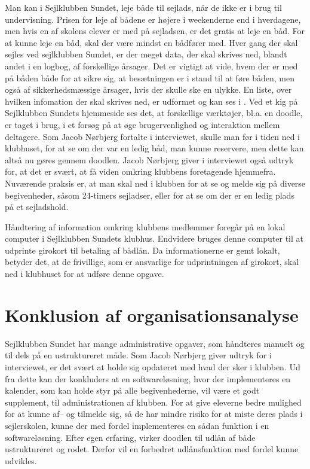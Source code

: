 Man kan i Sejlklubben Sundet, leje både til sejlads, når de ikke er i brug til undervisning. 
Prisen for leje af bådene er højere i weekenderne end i hverdagene, men hvis en af skolens elever er med på sejladsen, er det gratis at leje en båd. 
For at kunne leje en båd, skal der være mindst en bådfører med.
Hver gang der skal sejles ved sejlklubben Sundet, er der meget data, der skal skrives ned, blandt andet i en logbog, af forskellige årsager. 
Det er vigtigt at vide, hvem der er med på båden både for at sikre sig, at besætningen er i stand til at føre båden, men også af sikkerhedsmæssige årsager, hvis der skulle ske en ulykke. 
En liste, over hvilken infomation der skal skrives ned, er udformet og kan ses i . 
Ved et kig på Sejlklubben Sundets hjemmeside \citep{SundetUdlaan} ses det, at forskellige værktøjer, bl.a. en doodle, er taget i brug, i et forsøg på at øge brugervenlighed og interaktion mellem deltagere. 
Som Jacob Nørbjerg fortalte i interviewet, skulle man før i tiden ned i klubhuset, for at se om der var en ledig båd, man kunne reservere, men dette kan altså nu gøres gennem doodlen. 
Jacob Nørbjerg giver i interviewet også udtryk for, at det er svært, at få viden omkring klubbens foretagende hjemmefra. 
Nuværende praksis er, at man skal ned i klubben for at se og melde sig på diverse begivenheder, såsom 24-timers sejladser, eller for at se om der er en ledig plads på et sejladshold.

Håndtering af information omkring klubbens medlemmer foregår på en lokal computer i Sejlklubben Sundets
klubhus. Endvidere bruges denne computer til at udprinte girokort til betaling af bådlån. Da informationerne
er gemt lokalt, betyder det, at de frivillige, som er ansvarlige for udprintningen af girokort, skal ned i
klubhuset for at udføre denne opgave.


\section{Konklusion af organisationsanalyse}\label{sec:organisation-konklusion}

Sejlklubben Sundet har mange administrative opgaver, som håndteres manuelt og til dels på en ustruktureret
måde. 
Som Jacob Nørbjerg giver udtryk for i interviewet, er det svært at holde sig opdateret med hvad der sker i klubben. Ud fra dette kan der konkluders at en softwareløsning, hvor der implementeres en kalender, som kan holde styr på alle begivenhederne, vil være et godt supplement, til administrationen af klubben. 
For at give eleverne bedre mulighed for at kunne af-- og tilmelde sig, så de har mindre risiko for at miste deres plads i sejlerskolen, kunne der med fordel implementeres en sådan funktion i en softwareløsning. 
Efter egen erfaring, virker doodlen til udlån af både ustruktureret og rodet. 
Derfor vil en forbedret udlånsfunktion med fordel kunne udvikles.

